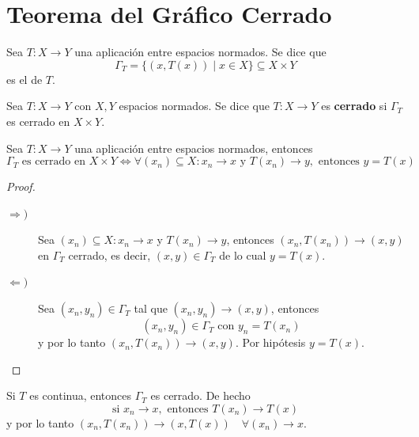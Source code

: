 \section{Teorema del Gráfico Cerrado}

\begin{definicion}
    Sea $T: X \to Y$ una aplicación entre espacios normados. Se dice que 
    \begin{equation*}
        \Gamma_T = \{ (x, T(x)) \mid x \in X \} \subseteq X \times Y
    \end{equation*}
    es el  de $T$. \\
\end{definicion}

\begin{definicion}
    Sea $T: X \to Y$ con $X, Y$ espacios normados. Se dice que $T: X \to Y$ es \textbf{cerrado} si $\Gamma_T$ es cerrado en $X \times Y$. \\
\end{definicion}

\begin{prop}
    Sea $T: X \to Y$ una aplicación entre espacios normados, entonces
    \begin{equation*}
        \Gamma_T \text{ es cerrado en } X \times Y \iff \forall (x_n) \subseteq X : x_n \to x \text{ y } T(x_n) \to y, \text{ entonces } y = T(x)
    \end{equation*}
\begin{proof}
    \begin{description}
        \item[$\Longrightarrow )$] Sea $(x_n) \subseteq X : x_n \to x$ y $T(x_n) \to y$, entonces $(x_n, T(x_n)) \to (x, y)$ en $\Gamma_T$ cerrado, es decir, $(x, y) \in \Gamma_T$ de lo cual $y = T(x)$. 
        \item[$\Longleftarrow )$] Sea $(x_n, y_n) \in \Gamma_T$ tal que $(x_n, y_n) \to (x, y)$, entonces
        $$(x_n, y_n) \in \Gamma_T \text{ con } y_n = T(x_n)$$ 
        y por lo tanto $(x_n, T(x_n)) \to (x, y)$. Por hipótesis $y = T(x)$.
    \end{description}
\end{proof}
\end{prop}


\begin{observacion}
    Si $T$ es continua, entonces $\Gamma_T$ es cerrado. De hecho
    \begin{equation*}
        \text{si } x_n \to x, \text{ entonces } T(x_n) \to T(x)
    \end{equation*}
    y por lo tanto $(x_n, T(x_n)) \to (x, T(x)) \quad \forall (x_n) \to x$. \\
\end{observacion}


